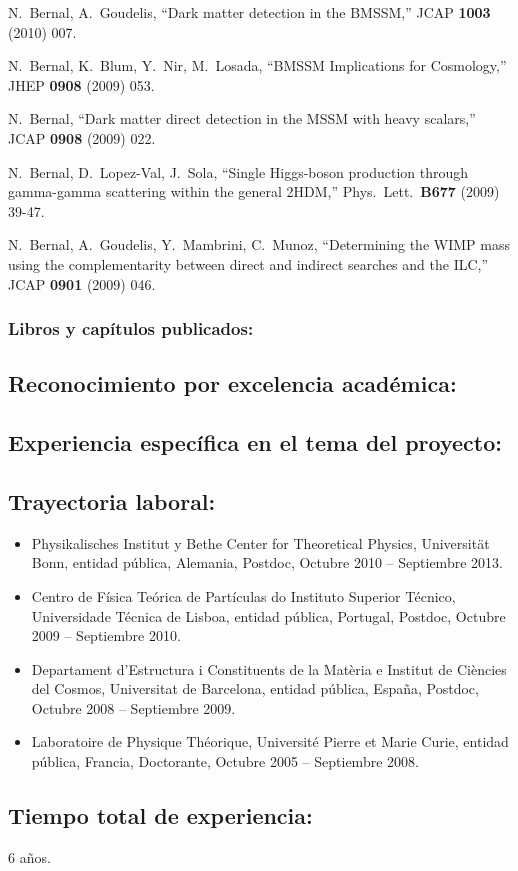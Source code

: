   N.~Bernal, A.~Goudelis,
  ``Dark matter detection in the BMSSM,''
  JCAP {\bf 1003 } (2010)  007.

  N.~Bernal, K.~Blum, Y.~Nir, M.~Losada,
  ``BMSSM Implications for Cosmology,''
  JHEP {\bf 0908 } (2009)  053.

  N.~Bernal,
  ``Dark matter direct detection in the MSSM with heavy scalars,''
  JCAP {\bf 0908 } (2009)  022.

  N.~Bernal, D.~Lopez-Val, J.~Sola,
  ``Single Higgs-boson production through gamma-gamma scattering within the general 2HDM,''
  Phys.\ Lett.\  {\bf B677 } (2009)  39-47.

  N.~Bernal, A.~Goudelis, Y.~Mambrini, C.~Munoz,
  ``Determining the WIMP mass using the complementarity between direct and indirect searches and the ILC,''
  JCAP {\bf 0901 } (2009)  046.
\subsubsection{Libros y capítulos publicados:}
\subsection{Reconocimiento por excelencia académica:}
\subsection{Experiencia específica en el tema del proyecto:}
\subsection{Trayectoria laboral:}
\begin{itemize}
\item Physikalisches Institut y Bethe Center for Theoretical Physics, Universität Bonn, entidad pública, Alemania, Postdoc, Octubre 2010 -- Septiembre 2013.
\item Centro de Física Teórica de Partículas do Instituto Superior Técnico, Universidade Técnica de Lisboa, entidad pública, Portugal, Postdoc, Octubre 2009 -- Septiembre 2010.
\item Departament d'Estructura i Constituents de la Matèria e Institut de Ciències del Cosmos, Universitat de Barcelona, entidad pública, España, Postdoc, Octubre 2008 -- Septiembre 2009.
\item Laboratoire de Physique Théorique, Université Pierre et Marie Curie, entidad pública, Francia, Doctorante, Octubre 2005 -- Septiembre 2008.
\end{itemize}
\subsection{Tiempo total de experiencia:}
6 años.


